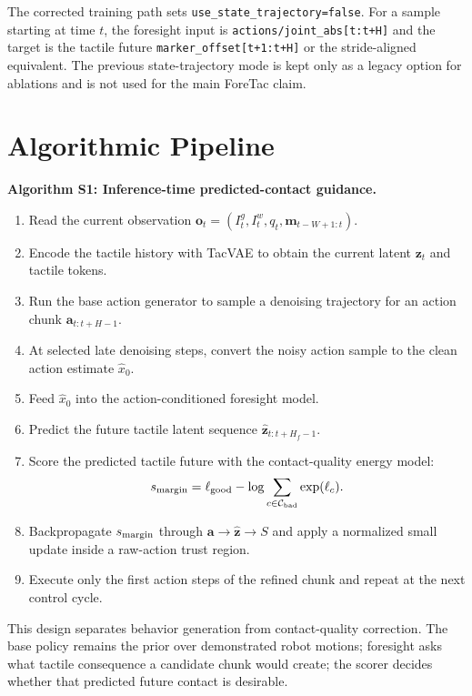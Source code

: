\documentclass[10pt,letterpaper]{article}
\newcommand{\method}{ForeTac}
\newcommand{\marker}{\mathbf{m}}
\newcommand{\action}{\mathbf{a}}
\newcommand{\obs}{\mathbf{o}}
\newcommand{\latent}{\mathbf{z}}
\newcommand{\score}{S}
\begin{document}
The corrected training path sets \texttt{use\_state\_trajectory=false}.
For a sample starting at time $t$, the foresight input is
\texttt{actions/joint\_abs[t:t+H]} and the target is the tactile future
\texttt{marker\_offset[t+1:t+H]} or the stride-aligned equivalent. The previous
state-trajectory mode is kept only as a legacy option for ablations and is not
used for the main \method{} claim.

\section{Algorithmic Pipeline}
\label{sec:algorithm}

\noindent\textbf{Algorithm S1: Inference-time predicted-contact guidance.}
\begin{enumerate}
\item Read the current observation $\obs_t=(I_t^g,I_t^w,q_t,
\marker_{t-W+1:t})$.
\item Encode the tactile history with TacVAE to obtain the current latent
$\latent_t$ and tactile tokens.
\item Run the base action generator to sample a denoising trajectory for an
action chunk $\action_{t:t+H-1}$.
\item At selected late denoising steps, convert the noisy action sample to the
clean action estimate $\hat{x}_0$.
\item Feed $\hat{x}_0$ into the action-conditioned foresight model.
\item Predict the future tactile latent sequence
$\hat{\latent}_{t:t+H_f-1}$.
\item Score the predicted tactile future with the contact-quality energy model:
\begin{equation}
s_{\rm margin}
= \ell_{\rm good}
- \log \sum_{c \in \mathcal{C}_{\rm bad}} \exp(\ell_c).
\end{equation}
\item Backpropagate $s_{\rm margin}$ through
$\action \rightarrow \hat{\latent} \rightarrow \score$ and apply a normalized
small update inside a raw-action trust region.
\item Execute only the first action steps of the refined chunk and repeat at
the next control cycle.
\end{enumerate}

This design separates behavior generation from contact-quality correction. The
base policy remains the prior over demonstrated robot motions; foresight asks
what tactile consequence a candidate chunk would create; the scorer decides
whether that predicted future contact is desirable.
\end{document}
